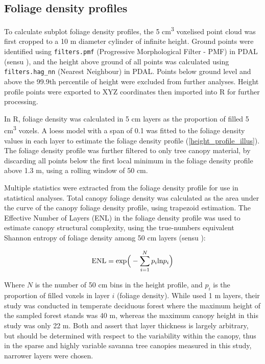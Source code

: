 \documentclass[11pt,a4paper]{article}
\begin{document}
\subsection{Foliage density profiles}

To calculate subplot foliage density profiles, the 5 cm\textsuperscript{3} voxelised point cloud was first cropped to a 10 m diameter cylinder of infinite height. Ground points were identified using \texttt{filters.pmf} (Progressive Morphological Filter - PMF) in PDAL (sensu \citealt{Zhang2003}), and the height above ground of all points was calculated using \texttt{filters.hag\_nn} (Nearest Neighbour) in PDAL. Points below ground level and above the 99.9th percentile of height were excluded from further analyses. Height profile points were exported to XYZ coordinates then imported into R for further processing. 

In R, foliage density was calculated in 5 cm layers as the proportion of filled 5 cm\textsuperscript{3} voxels. A loess model with a span of 0.1 was fitted to the foliage density values in each layer to estimate the foliage density profile (\autoref{height_profile_illus}). The foliage density profile was further filtered to only tree canopy material, by discarding all points below the first local minimum in the foliage density profile above 1.3 m, using a rolling window of 50 cm.

Multiple statistics were extracted from the foliage density profile for use in statistical analyses. Total canopy foliage density was calculated as the area under the curve of the canopy foliage density profile, using trapezoid estimation. The Effective Number of Layers (ENL) in the foliage density profile was used to estimate canopy structural complexity, using the true-numbers equivalent Shannon entropy of foliage density among 50 cm layers (sensu \citealt{Ehbrecht2016}):

\begin{equation}
	\text{ENL} = \text{exp}\Big{(} - \sum_{i=1}^{N} p_{i} \text{ln} p_{i} \Big{)}
\end{equation}

Where $N$ is the number of 50 cm bins in the height profile, and $p_{i}$ is the proportion of filled voxels in layer $i$ (foliage density). While \citet{Ehbrecht2016} used 1 m layers, their study was conducted in temperate deciduous forest where the maximum height of the sampled forest stands was 40 m, whereas the maximum canopy height in this study was only 22 m. Both \citet{Ehbrecht2016} and \citet{Montes2004} assert that layer thickness is largely arbitrary, but should be determined with respect to the variability within the canopy, thus in the sparse and highly variable savanna tree canopies measured in this study, narrower layers were chosen. 
\end{document}
